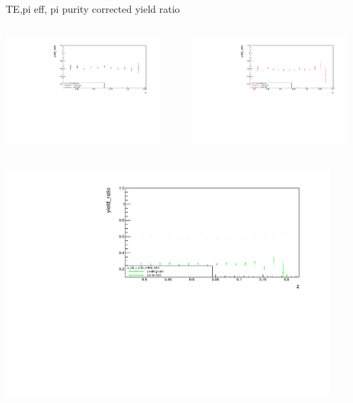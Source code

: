 \begin{frame}{TE,pi eff, pi purity corrected yield ratio}
\begin{columns}
\begin{column}[T]{0.5\textwidth}
\includegraphics[width = 0.9\textwidth]{results/yield/statistics_corr/x_Q2_z_45_3898_40_ratio.pdf}
\end{column}
\begin{column}[T]{0.5\textwidth}
\includegraphics[width = 0.9\textwidth]{results/yield/statistics_corr/x_Q2_z_45_3898_50_ratio.pdf}
\end{column}
\end{columns}
\begin{columns}
\begin{column}[T]{0.5\textwidth}
\includegraphics[width = 0.9\textwidth]{results/yield/statistics_corr/x_Q2_z_45_3898_60_ratio.pdf}

\end{column}
\end{columns}
\end{frame}
